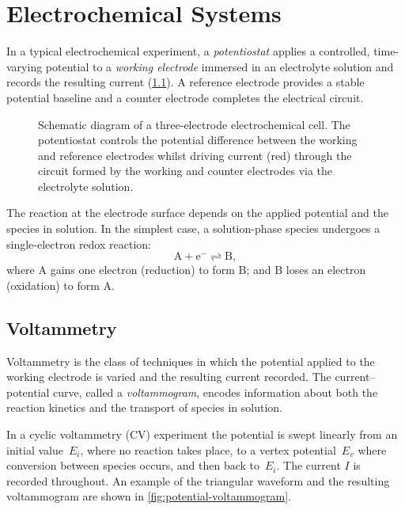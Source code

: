\chapter{Electrochemical Systems}\label{ch:electrochem}

In a typical electrochemical experiment, a \emph{potentiostat} applies a
controlled, time-varying potential to a \emph{working electrode} immersed
in an electrolyte solution and records the resulting current
(\cref{fig:electrochemical-cell}). A reference electrode provides a
stable potential baseline and a counter electrode completes the
electrical circuit.

\begin{figure}
  \centering
  
  \caption[Schematic diagram of a three-electrode electrochemical
  cell]{Schematic diagram of a three-electrode electrochemical cell. The
    potentiostat controls the potential difference between the working
    and reference electrodes whilst driving current (red) through the
    circuit formed by the working and counter electrodes via the
  electrolyte solution.}
  \label{fig:electrochemical-cell}
\end{figure}

The reaction at the electrode surface depends on the applied potential and
the species in solution. In the simplest case, a solution-phase species
undergoes a single-electron redox reaction:
\begin{equation}\label{eq:redox}
  \mathrm{A} + \mathrm{e}^{-} \rightleftharpoons \mathrm{B},
\end{equation}
where $\mathrm{A}$ gains one electron (reduction) to form $\mathrm{B}$;
and $\mathrm{B}$ loses an electron (oxidation) to form $\mathrm{A}$.

\section{Voltammetry}

Voltammetry is the class of techniques in which the potential applied to
the working electrode is varied and the resulting current recorded. The
current--potential curve, called a \emph{voltammogram}, encodes
information about both the reaction kinetics and the transport of species
in solution.

In a cyclic voltammetry (CV) experiment the potential is swept linearly
from an initial value~$E_i$, where no reaction takes place, to a vertex
potential~$E_v$ where conversion between species occurs, and then
back to~$E_i$. The current $I$ is recorded throughout. An example of
the triangular waveform and the resulting voltammogram are shown in
\cref{fig:potential-voltammogram}.

